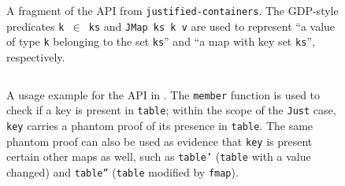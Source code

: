 \documentclass[format=sigplan, review=false, screen=true]{acmart}
\begin{document}
\begin{figure}
  \inputminted{haskell}{justified.hs}
  \caption{A fragment of the API from \texttt{justified-containers}.
    The GDP-style predicates \texttt{k $\in$ ks} and \texttt{JMap ks k v} are used to represent
    ``a value of type \texttt{k} belonging to the set \texttt{ks}'' and ``a map with key set \texttt{ks}'',
    respectively. \label{justified-api}}
\end{figure}
\begin{figure}
  \inputminted{haskell}{justified-usage.hs}
  \caption{A usage example for the API in . The \texttt{member} function is used
    to check if a key is present in \texttt{table}; within the scope of the \texttt{Just} case, \texttt{key}
    carries a phantom proof of its presence in \texttt{table}. The same phantom proof can also be used as evidence that
    \texttt{key} is present certain other maps as well, such as \texttt{table'} (\texttt{table} with a
    value changed) and \texttt{table''} (\texttt{table} modified by \texttt{fmap}).\label{justified-usage}} 
\end{figure}



\end{document}
